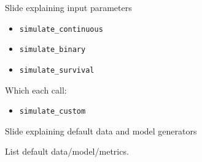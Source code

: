 \documentclass[11pt]{beamer}
\begin{document}
\begin{frame}[t]{Slide explaining input parameters}

	\begin{itemize}
		\item \texttt{simulate\_continuous}
		\item \texttt{simulate\_binary}
		\item \texttt{simulate\_survival}
	\end{itemize}

	Which each call:

	\begin{itemize}
		\item \texttt{simulate\_custom}
	\end{itemize}

\end{frame}

\begin{frame}[t]{Slide explaining default data and model generators}

    List default data/model/metrics.

\end{frame}
\end{document}
